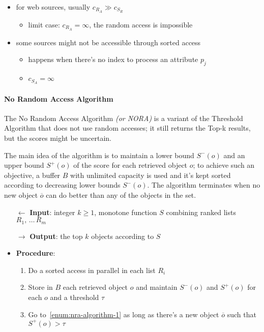 \documentclass[english]{article}
\begin{document}
\begin{itemize}
  \item for web sources, usually \(c_{R_A} \gg c_{S_R}\)
        \begin{itemize}
          \item limit case: \(c_{R_A} = \infty\), the random access is impossible
        \end{itemize}
  \item some sources might not be accessible through sorted access
        \begin{itemize}
          \item happens when there's no index to process an attribute \(p_j\)
          \item \(c_{S_A} = \infty\)
        \end{itemize}
\end{itemize}

\paragraph{No Random Access Algorithm}
The No Random Access Algorithm \textit{(or NORA)} is a variant of the Threshold Algorithm that does not use random accesses;
it still returns the Top-k results, but the scores might be uncertain.

The main idea of the algorithm is to maintain a lower bound \(S^-(o)\) and an upper bound \(S^+(o)\) of the score for each retrieved object \(o\);
to achieve such an objective, a buffer \(B\) with unlimited capacity is used and it's kept sorted according to decreasing lower bounds \(S^-(o)\).
The algorithm terminates when no new object \(\overline{o}\) can do better than any of the objects in the set.

\begin{itemize}
  \item[\(\leftarrow\)] \textbf{Input}: integer \(k \geq 1\), monotone function \(S\) combining ranked lists \(R_1, \,\ldots\, R_m\)
  \item[\(\rightarrow\)] \textbf{Output}: the top \(k\) objects according to \(S\)
  \item \textbf{Procedure}:
        \begin{enumerate}[label=step \arabic*., ref=step (\arabic*), widest*=7, leftmargin=*, labelindent=1em]
          \item\label{enum:nra-algorithm-1} Do a sorted access in parallel in each list \(R_i\)
          \item Store in \(B\) each retrieved object \(o\) and maintain \(S^-(o)\) and \(S^+(o)\) for each \(o\) and a threshold \(\tau\)
          \item Go to~\ref{enum:nra-algorithm-1} as long as there's a new object \(\overline{o}\) such that \(S^+(o) > \tau\)
        \end{enumerate}
\end{itemize}
\end{document}
